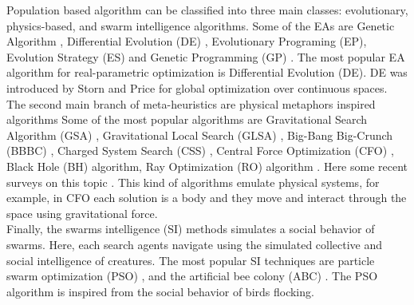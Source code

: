 \documentclass[conference]{IEEEtran}
\begin{document}
Population based algorithm can be classified into three main classes:
evolutionary, physics-based, and swarm intelligence algorithms.
Some of the EAs are Genetic Algorithm \cite{melanie96}, Differential Evolution (DE) \cite{ed1995}, Evolutionary Programing (EP), Evolution Strategy (ES) and Genetic Programming (GP) \cite{back,spall03}.
%
The most popular EA algorithm for real-parametric optimization is Differential Evolution (DE).
DE was introduced by Storn and Price \cite{ed1995}  for global optimization over continuous spaces.\\
%

The second main branch of meta-heuristics are physical metaphors inspired algorithms
Some of the most popular algorithms are Gravitational  Search Algorithm (GSA) \cite{rashedi2009gsa}, Gravitational Local Search (GLSA) \cite{glsa}, Big-Bang Big-Crunch (BBBC) \cite{erol2006new}, Charged System Search (CSS) \cite{kaveh2010novel}, Central Force Optimization (CFO) \cite{cfo2007}, Black Hole (BH) \cite{hatamlou2013black} algorithm, Ray Optimization (RO) algorithm \cite{kaveh2012new}. Here some recent surveys on this topic \cite{fisicaSurvey,biswas2013physics,xie2011convergence,DBLP:journals/corr/FisterYFBF13}. This kind of algorithms emulate physical systems, for example, in CFO each solution is a body and they move and interact through the space using gravitational force.\\
% 

Finally, the swarms intelligence (SI) methods simulates a social behavior of swarms. Here, each search agents navigate using the simulated collective and social intelligence of creatures. The most popular SI techniques are particle swarm optimization (PSO) \cite{pso1995}, and the artificial bee colony (ABC) \cite{abc2005}. The PSO algorithm is inspired from the social behavior of birds flocking.\\
\end{document}
